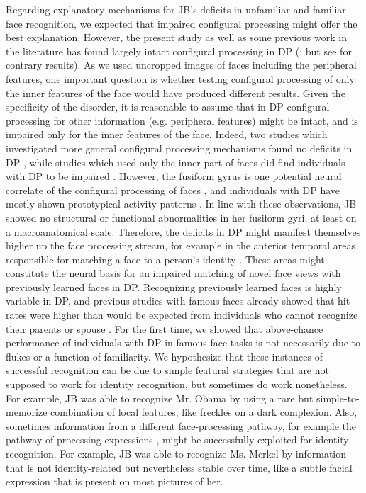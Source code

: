 \documentclass[fleqn,10pt]{SelfArx} %
\begin{document}
Regarding explanatory mechanisms for JB's deficits in unfamiliar and familiar face recognition, we expected that impaired configural processing might offer the best explanation. However, the present study as well as some previous work in the literature has found largely intact configural processing in DP (\citet{Duchaine_2000, Le_Grand_2006}; but see \citet{Behrmann_2005} for contrary results). As we used uncropped images of faces including the peripheral features, one important question is whether testing configural processing of only the inner features of the face would have produced different results. Given the specificity of the disorder, it is reasonable to assume that in DP configural processing for other information (e.g. peripheral features) might be intact, and is impaired only for the inner features of the face. Indeed, two studies which investigated more general configural processing mechanisms found no deficits in DP \citep{Duchaine_2000, Le_Grand_2006}, while studies which used only the inner part of faces did find individuals with DP to be impaired \citep{Avidan_2011, Palermo_2011}. However, the fusiform gyrus is one potential neural correlate of the configural processing of faces \citep{Schiltz_2006}, and individuals with DP have mostly shown prototypical activity patterns \citep{Hasson_2003, Avidan_2005, Furl_2011}. In line with these observations, JB showed no structural or functional abnormalities in her fusiform gyri, at least on a macroanatomical scale. Therefore, the deficits in DP might manifest themselves higher up the face processing stream, for example in the anterior temporal areas responsible for matching a face to a person's identity \citep{Kriegeskorte_2007, Landi_2017}. These areas might constitute the neural basis for an impaired matching of novel face views with previously learned faces \citep{Duchaine_2000} in DP. Recognizing previously learned faces is highly variable in DP, and previous studies with famous faces already showed that hit rates were higher than would be expected from individuals who cannot recognize their parents or spouse \citep{Rivolta_2012, Garrido_2009}. For the first time, we showed that above-chance performance of individuals with DP in famous face tasks is not necessarily due to flukes or a function of familiarity. We hypothesize that these instances of successful recognition can be due to simple featural strategies that are not supposed to work for identity recognition, but sometimes do work nonetheless. For example, JB was able to recognize Mr. Obama by using a rare but simple-to-memorize combination of local features, like freckles on a dark complexion. Also, sometimes information from a different face-processing pathway, for example the pathway of processing expressions \citep{Haxby_2000, Calder_2005}, might be successfully exploited for identity recognition. For example, JB was able to recognize Ms. Merkel by information that is not identity-related but nevertheless stable over time, like a subtle facial expression that is present on most pictures of her.
\end{document}
